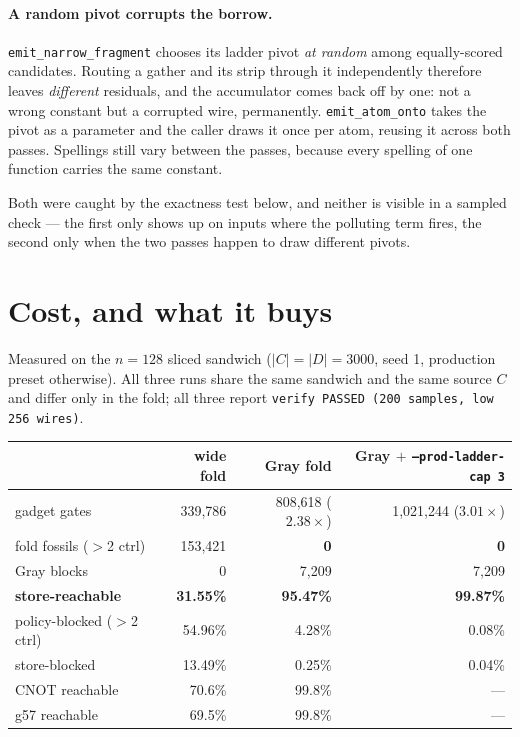 \documentclass[11pt]{article}
\newcommand{\code}[1]{\texttt{#1}}
\begin{document}
\paragraph{A random pivot corrupts the borrow.}
\code{emit\_narrow\_fragment} chooses its ladder pivot \emph{at random} among
equally-scored candidates. Routing a gather and its strip through it
independently therefore leaves \emph{different} residuals, and the accumulator
comes back off by one: not a wrong constant but a corrupted wire, permanently.
\code{emit\_atom\_onto} takes the pivot as a parameter and the caller draws it
once per atom, reusing it across both passes. Spellings still vary between the
passes, because every spelling of one function carries the same constant.

Both were caught by the exactness test below, and neither is visible in a
sampled check --- the first only shows up on inputs where the polluting term
fires, the second only when the two passes happen to draw different pivots.

\section{Cost, and what it buys}

Measured on the $n=128$ sliced sandwich ($|C|=|D|=3000$, seed 1, production
preset otherwise). All three runs share the same sandwich and the same source
$C$ and differ only in the fold; all three report
\code{verify PASSED (200 samples, low 256 wires)}.

\begin{center}
\begin{tabular}{lrrr}
\toprule
 & wide fold & Gray fold & Gray $+$ \code{--prod-ladder-cap 3} \\
\midrule
gadget gates            & 339{,}786 & 808{,}618 ($2.38\times$) & 1{,}021{,}244 ($3.01\times$) \\
fold fossils ($>$2 ctrl)& 153{,}421 & \textbf{0} & \textbf{0} \\
Gray blocks             & 0         & 7{,}209    & 7{,}209 \\
\midrule
\textbf{store-reachable}& \textbf{31.55\%} & \textbf{95.47\%} & \textbf{99.87\%} \\
policy-blocked ($>$2 ctrl) & 54.96\% & 4.28\%  & 0.08\% \\
store-blocked           & 13.49\%   & 0.25\%  & 0.04\% \\
CNOT reachable          & 70.6\%    & 99.8\%  & --- \\
g57 reachable           & 69.5\%    & 99.8\%  & --- \\
\bottomrule
\end{tabular}
\end{center}
\end{document}
